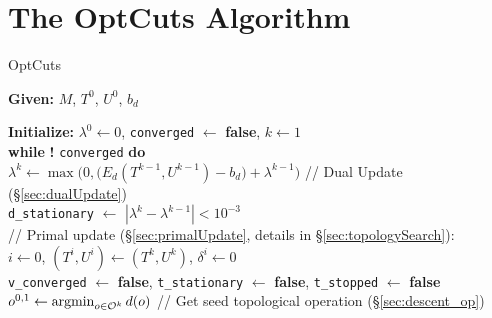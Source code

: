 
\section{The OptCuts Algorithm}%
\label{sec:imp}

\begin{algorithm}[t]
\label{alg:OptCuts}
\caption{OptCuts}

\textbf{Given:} $M$, $T^0$, $U^0$, $b_d$ 

\textbf{Initialize:} $\lambda^0 \leftarrow 0$,  \hspace{2pt} \texttt{converged} $\leftarrow$ \textbf{false},  \hspace{2pt} $k \leftarrow 1$\\

\textbf{while} \hspace{2pt} \textbf{!}  \texttt{converged} \hspace{2pt} \textbf{do} \\


\hspace{10pt} $\lambda^{k} \leftarrow \max\big(0,\big( E_{d}(T^{k-1}, U^{k-1}) -b_d \big) + \lambda^{k-1}\big)$ \hspace{7pt} // Dual Update (\S\ref{sec:dualUpdate})\\
\hspace{10pt} \texttt{d\_stationary} $\leftarrow$ $| \lambda^{k} - \lambda^{k-1} | < 10^{-3}$ \\

\hspace{10pt} // Primal update (\S\ref{sec:primalUpdate}, details in \S\ref{sec:topologySearch}): \\
\hspace{10pt} $i \leftarrow 0$, \hspace{2pt} $(T^{i},U^{i}) \leftarrow (T^{k},U^{k})$, \hspace{2pt} $\delta^{i} \leftarrow 0$ \\
\hspace{10pt} \texttt{v\_converged} $\leftarrow$ \textbf{false}, \texttt{t\_stationary} $\leftarrow$ \textbf{false}, \texttt{t\_stopped} $\leftarrow$ \textbf{false} \\
\hspace{10pt} $o^{0,1} \leftarrow \operatorname*{argmin}_{o \in \mathcal{O}^k} d(o)$ \hspace{10pt}//  Get seed topological operation (\S\ref{sec:descent_op})\\


\end{algorithm}
